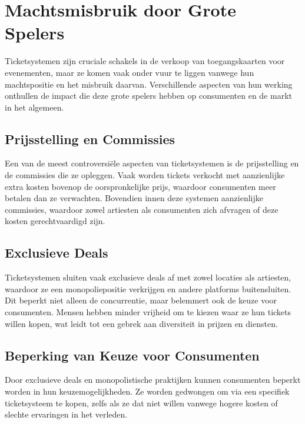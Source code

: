 

\section{Machtsmisbruik door Grote Spelers}

Ticketsystemen zijn cruciale schakels in de verkoop van toegangskaarten voor evenementen, 
maar ze komen vaak onder vuur te liggen vanwege hun machtspositie en het misbruik daarvan. 
Verschillende aspecten van hun werking onthullen de impact die deze grote spelers hebben op consumenten en de markt in het algemeen.

\subsection{Prijsstelling en Commissies}

Een van de meest controversiële aspecten van ticketsystemen is de prijsstelling en de commissies die ze opleggen. 
Vaak worden tickets verkocht met aanzienlijke extra kosten bovenop de oorspronkelijke prijs, 
waardoor consumenten meer betalen dan ze verwachten. Bovendien innen deze systemen aanzienlijke commissies, 
waardoor zowel artiesten als consumenten zich afvragen of deze kosten gerechtvaardigd zijn.

\subsection{Exclusieve Deals}

Ticketsystemen sluiten vaak exclusieve deals af met zowel locaties als artiesten, 
waardoor ze een monopoliepositie verkrijgen en andere platforms buitensluiten. 
Dit beperkt niet alleen de concurrentie, 
maar belemmert ook de keuze voor consumenten. 
Mensen hebben minder vrijheid om te kiezen waar ze hun tickets willen kopen, 
wat leidt tot een gebrek aan diversiteit in prijzen en diensten.

\subsection{Beperking van Keuze voor Consumenten}

Door exclusieve deals en monopolistische praktijken kunnen consumenten beperkt worden in hun keuzemogelijkheden. 
Ze worden gedwongen om via een specifiek ticketsysteem te kopen, 
zelfs als ze dat niet willen vanwege hogere kosten of slechte ervaringen in het verleden.

